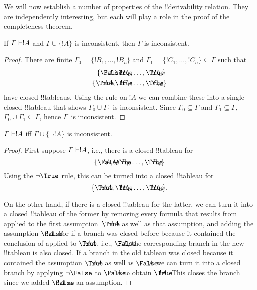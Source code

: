 \documentclass[../../../include/open-logic-section]{subfiles}
\begin{document}
      {}
      {}


We will now establish a number of properties of the !!{derivability}
relation.  They are independently interesting, but each will play a
role in the proof of the completeness theorem.

\begin{prop}
  If $\Gamma \Proves !A$ and $\Gamma \cup \{!A\}$ is
  inconsistent, then $\Gamma$ is inconsistent.
\end{prop}

\begin{proof}
There are finite $\Gamma_0 = \{!B_1, \dots, !B_n\}$ and $\Gamma_1
  =\{!C_1, \dots, !C_n\} \subseteq \Gamma$ such that
  \begin{align*}
    \{\sFmla{\False}{!A}, &
    \sFmla{\True}{!B_1}, \dots, \sFmla{\True}{!B_n}\} \\
    \{\sFmla{\True}{\lnot !A}, &
    \sFmla{\True}{!C_1}, \dots, \sFmla{\True}{!C_m}\}
  \end{align*}
  have closed !!{tableau}s.  Using the \Cut{} rule on $!A$ we can
  combine these into a single closed !!{tableau} that shows $\Gamma_0
  \cup \Gamma_1$ is inconsistent.  Since $\Gamma_0
  \subseteq \Gamma$ and $\Gamma_1 \subseteq \Gamma$, $\Gamma_0 \cup
  \Gamma_1 \subseteq \Gamma$, hence $\Gamma$~is inconsistent.
\end{proof}

\begin{prop}
$\Gamma \Proves !A$ iff $\Gamma \cup \{\lnot !A\}$ is inconsistent.
\end{prop}

\begin{proof}
First suppose $\Gamma \Proves !A$, i.e., there is
a closed !!{tableau} for
\[
\{\sFmla{\False}{!A},
\sFmla{\True}{!B_1}, \dots, \sFmla{\True}{!B_n}\}
\]
Using the $\TRule{\True}{\lnot}$ rule, this can be turned into a
closed !!{tableau} for
\[
\{\sFmla{\True}{\lnot !A},
\sFmla{\True}{!B_1}, \dots, \sFmla{\True}{!B_n}\}.
\]

On the other hand, if there is a closed !!{tableau} for the latter, we
can turn it into a closed !!{tableau} of the former by removing every
formula that results from \TRule{\True}{\lnot} applied to the first
assumption~$\sFmla{\True}{\lnot !A}$ as well as that assumption, and
adding the assumption $\sFmla{\False}{!A}$. For if a branch was closed
before because it contained the conclusion of \TRule{\True}{\lnot}
applied to $\sFmla{\True}{\lnot !A}$, i.e., $\sFmla{\False}{!A}$, the
corresponding branch in the new !!{tableau} is also closed. If a
branch in the old tableau was closed because it contained the
assumption $\sFmla{\True}{\lnot !A}$ as well as $\sFmla{\False}{\lnot
  !A}$ we can turn it into a closed branch by applying
$\TRule{\False}{\lnot}$ to $\sFmla{\False}{\lnot !A}$ to obtain
$\sFmla{\True}{!A}$. This closes the branch since we added
$\sFmla{\False}{!A}$ as an assumption.
\end{proof}
\end{document}
